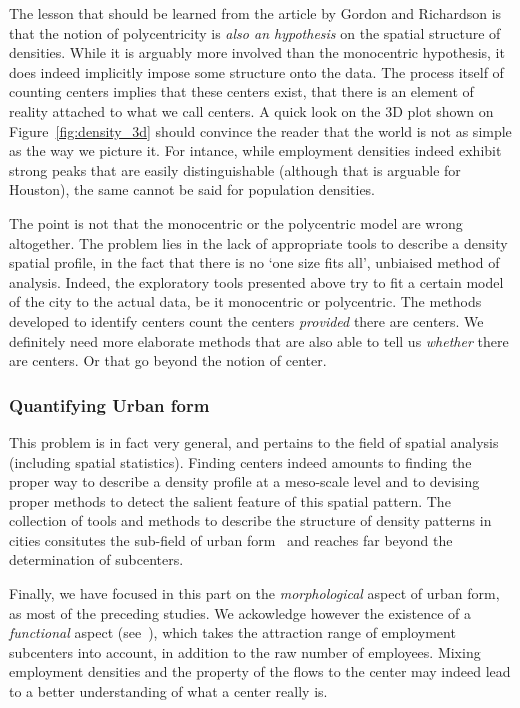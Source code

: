 The lesson that should be learned from the article by Gordon and Richardson is
that the notion of polycentricity is \emph{also an hypothesis} on the spatial
structure of densities. While it is arguably more involved than the monocentric
hypothesis, it does indeed implicitly impose some structure onto the data. The
process itself of counting centers implies that these centers exist, that there
is an element of reality attached to what we call centers. A quick look on the
3D plot shown on Figure~\ref{fig:density_3d} should convince the reader that the world
is not as simple as the way we picture it. For intance, while employment
densities indeed exhibit strong peaks that are easily distinguishable (although
that is arguable for Houston), the same cannot be said for population densities.

The point is not that the monocentric or the polycentric model are wrong
altogether. The problem lies in the lack of appropriate tools to describe a
density spatial profile, in the fact that there is no `one size fits all',
unbiaised method
of analysis. Indeed, the exploratory tools presented above try to fit a certain
model of the city to the actual data, be it monocentric or polycentric. The
methods developed to identify centers count the centers \emph{provided} there
are centers. We definitely need more elaborate methods that are also able to
tell us \emph{whether} there are centers. Or that go beyond the notion of
center.

\subsubsection{Quantifying Urban form}
\label{sub:urban_form}

This problem is in fact very general, and pertains to the field of spatial
analysis (including spatial statistics). Finding centers indeed amounts to
finding the proper way to describe a density profile at a meso-scale level and
to devising proper methods to detect the salient feature of this spatial
pattern. The collection of tools and methods to describe the structure
of density patterns in cities consitutes the sub-field of urban
form~\cite{Tsai:2005,Schwarz:2010,LeNechet:2010_these,LeNechet:2015} and reaches far beyond the
determination of subcenters.

Finally, we have focused in this part on the \emph{morphological} aspect of urban form,
as most of the preceding studies. We ackowledge however the existence of a
\emph{functional} aspect (see~\cite{Berroir:2008}), which takes the attraction
range of employment subcenters into account, in addition to the raw number of
employees. Mixing employment densities and the property of the flows to the
center may indeed lead to a better understanding of what a center really is.

